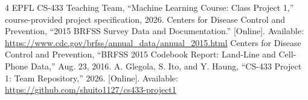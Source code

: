 \documentclass[10pt,conference,compsocconf]{IEEEtran}
\begin{document}
\begin{thebibliography}{4}
EPFL CS-433 Teaching Team,
``Machine Learning Course: Class Project 1,''
course-provided project specification, 2026.
Centers for Disease Control and Prevention,
``2015 BRFSS Survey Data and Documentation.''
[Online]. Available:
\url{https://www.cdc.gov/brfss/annual_data/annual_2015.html}
Centers for Disease Control and Prevention,
``BRFSS 2015 Codebook Report:
Land-Line and Cell-Phone Data,'' Aug. 23, 2016.
A. Glegola, S. Ito, and Y. Haung,
``CS-433 Project 1: Team Repository,'' 2026.
[Online]. Available:
\url{https://github.com/shuito1127/cs433-project1}
\end{thebibliography}
\end{document}
